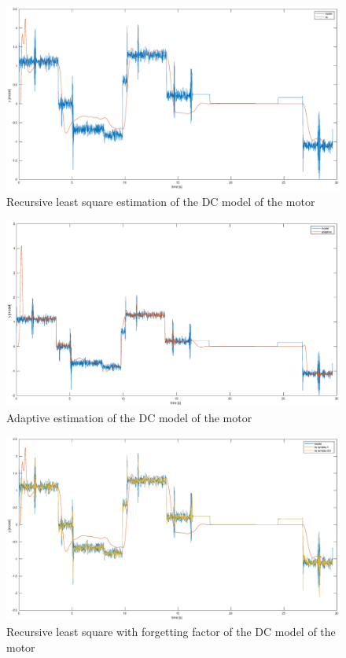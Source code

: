 \documentclass[a4paper,12pt]{article}
\begin{document}
\begin{figure}[H]
    \begin{center}
        \includegraphics[scale=0.3]{images/rls.eps}
    \end{center}
    \caption{Recursive least square estimation of the DC model of the motor}
    \label{fig:rls}
\end{figure}

\begin{figure}[H]
    \begin{center}
        \includegraphics[scale=0.3]{images/adaptive.eps}
    \end{center}
    \caption{Adaptive estimation of the DC model of the motor}
    \label{fig:adaptive}
\end{figure}

\begin{figure}[H]
    \begin{center}
        \includegraphics[scale=0.3]{images/rls_forget.eps}
    \end{center}
    \caption{Recursive least square with forgetting factor of the DC model of the motor}
    \label{fig:rls_f}
\end{figure}
\end{document}
